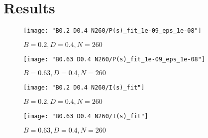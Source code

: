 \documentclass[../thesis.tex]{subfiles}
\begin{document}
\chapter{Results}

\begin{figure}
  \texttt{[image: "B0.2 D0.4 N260/P(s)\_fit\_1e-09\_eps\_1e-08"]}  %
  \caption{\(B=0.2, D=0.4, N=260\)}
\label{fig:P(s)-fit-b0.2n260}
\end{figure}

\begin{figure}
  \texttt{[image: "B0.63 D0.4 N260/P(s)\_fit\_1e-09\_eps\_1e-08"]}  %
  \caption{\(B=0.63, D=0.4, N=260\)}
\label{fig:P(s)-fit-b0.63n260}
\end{figure}

\begin{figure}
  \texttt{[image: "B0.2 D0.4 N260/I(s)\_fit"]}  %
  \caption{\(B=0.2, D=0.4, N=260\)}
\label{fig:I(s)-fit-b0.2n260}
\end{figure}

\begin{figure}
  \texttt{[image: "B0.63 D0.4 N260/I(s)\_fit"]}  %
  \caption{\(B=0.63, D=0.4, N=260\)}
\label{fig:I(s)-fit-b0.63n260}
\end{figure}
\end{document}
